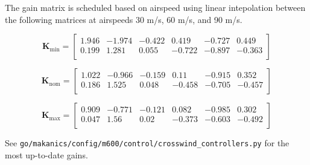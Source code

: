 \documentclass[11pt]{amsart}
\newcommand{\nom}{\mathrm{nom}}
\begin{document}
The gain matrix is scheduled based on airspeed using linear
intepolation between the following matrices at airspeeds 30 m/s, 60
m/s, and 90 m/s.

\begin{equation}
\mathbf{K}_{\min} = \left[
\begin{array}{cccccc}
  1.946 & -1.974 & -0.422 & 0.419 & -0.727 & 0.449 \\
  0.199 & 1.281 & 0.055 & -0.722 & -0.897 & -0.363 \\
\end{array}
\right]
\end{equation}

\begin{equation}
\mathbf{K}_{\nom} = \left[
\begin{array}{cccccc}
  1.022 & -0.966 & -0.159 & 0.11 & -0.915 & 0.352 \\
  0.186 & 1.525 & 0.048 & -0.458 & -0.705 & -0.457 \\
\end{array}
\right]
\end{equation}

\begin{equation}
\mathbf{K}_{\max} = \left[
\begin{array}{cccccc}
  0.909 & -0.771 & -0.121 & 0.082 & -0.985 & 0.302 \\
  0.047 & 1.56 & 0.02 & -0.373 & -0.603 & -0.492 \\
\end{array}
\right]
\end{equation}

See
\texttt{go/makanics/config/m600/control/crosswind\_controllers.py}
for the most up-to-date gains.




\end{document}
